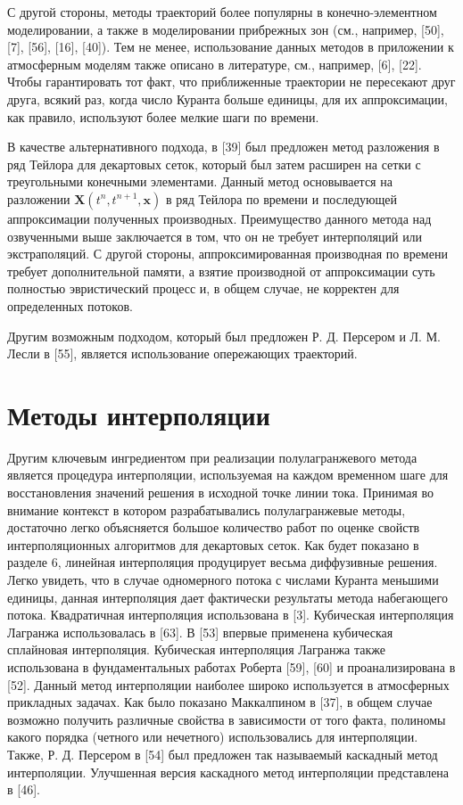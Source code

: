 С другой стороны, методы траекторий более популярны в конечно-элементном моделировании, а также в моделировании прибрежных зон (см., например, [50], [7], [56], [16], [40]). Тем не менее, использование данных методов в приложении к атмосферным моделям также описано в литературе, см., например, [6], [22]. Чтобы гарантировать тот факт, что приближенные траектории не пересекают друг друга, всякий раз, когда число Куранта больше единицы, для их аппроксимации, как правило, используют более мелкие шаги по времени.

В качестве альтернативного подхода, в [39] был предложен метод разложения в ряд Тейлора для декартовых сеток, который был затем расширен на сетки с треугольными конечными элементами. Данный метод основывается на разложении $\mathbf{X}(t^n,t^{n+1},\mathbf{x})$ в ряд Тейлора по времени и последующей аппроксимации полученных производных. Преимущество данного метода над озвученными выше заключается в том, что он не требует интерполяций или экстраполяций. С другой стороны, аппроксимированная производная по времени требует дополнительной памяти, а взятие производной от аппроксимации суть полностью эвристический процесс и, в общем случае, не корректен для определенных потоков.

Другим возможным подходом, который был предложен Р. Д. Персером и Л. М. Лесли в [55], является использование опережающих траекторий.
\section*{Методы интерполяции} \label{sect5_2}
Другим ключевым ингредиентом при реализации полулагранжевого метода является процедура интерполяции, используемая на каждом временном шаге для восстановления значений решения в исходной точке линии тока. Принимая во внимание контекст в котором разрабатывались полулагранжевые методы, достаточно легко объясняется большое количество работ по оценке свойств интерполяционных алгоритмов для декартовых сеток. Как будет показано в разделе 6, линейная интерполяция продуцирует весьма диффузивные решения. 
Легко увидеть, что в случае одномерного потока с числами Куранта меньшими единицы, данная интерполяция дает фактически результаты метода набегающего потока. Квадратичная интерполяция использована в [3]. Кубическая  интерполяция Лагранжа использовалась в [63]. В [53] впервые применена кубическая сплайновая интерполяция. Кубическая интерполяция Лагранжа также использована в фундаментальных работах Роберта [59], [60] и проанализирована в [52]. Данный метод интерполяции наиболее широко используется в атмосферных прикладных задачах. Как было показано Маккалпином в [37], в общем случае возможно получить различные свойства в зависимости от того факта, полиномы какого порядка (четного или нечетного) использовались для интерполяции. Также, Р. Д. Персером в [54] был предложен так называемый каскадный метод интерполяции. Улучшенная версия каскадного метод интерполяции представлена в [46].

